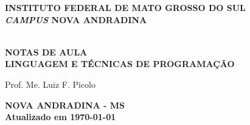 \thispagestyle{empty}

\vfill
 \begin{center}
    
    {\large\bfseries INSTITUTO FEDERAL DE MATO GROSSO DO SUL} \\
    
    {\large\bfseries \textit{CAMPUS} NOVA ANDRADINA}  \\ 

    \vspace*{1in}

    \vspace*{4cm}
    \noindent \\
    
    \large\bfseries{NOTAS DE AULA} \\
    \huge\bfseries{LINGUAGEM E TÉCNICAS DE PROGRAMAÇÃO}
    
    \vspace*{4cm}
    
    \large{Prof. Me. Luiz F. Picolo}
    
    \vfill
    \large\bfseries{NOVA ANDRADINA - MS} \\ 
    \vspace{0.2cm}
    \small Atualizado em \today
\end{center}

\normalsize


